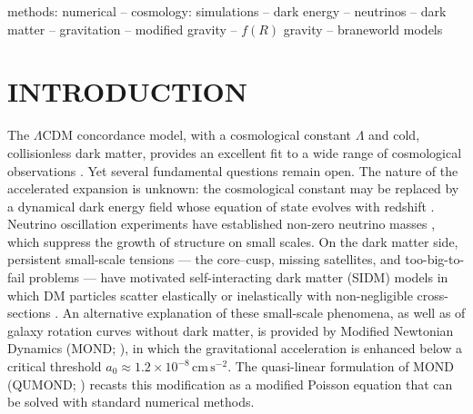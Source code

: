 \documentclass[fleqn,usenatbib]{mnras}
\newcommand{\azero}{a_0}
\begin{document}
\begin{keywords}
methods: numerical -- cosmology: simulations -- dark energy --
neutrinos -- dark matter -- gravitation -- modified gravity --
$f(R)$ gravity -- braneworld models
\end{keywords}

\section{INTRODUCTION}
\label{sec:intro}

The $\Lambda$CDM concordance model, with a cosmological constant
$\Lambda$ and cold, collisionless dark matter, provides an excellent
fit to a wide range of cosmological observations
\citep{PlanckCollaboration2020}.  Yet several fundamental questions
remain open.  The nature of the accelerated expansion is unknown: the
cosmological constant may be replaced by a dynamical dark energy field
whose equation of state evolves with redshift
\citep{Chevallier2001,Linder2003}.  Neutrino oscillation experiments
have established non-zero neutrino masses
\citep{Lesgourgues2006,Lattanzi2017}, which suppress the growth of
structure on small scales.  On the dark matter side, persistent
small-scale tensions --- the core--cusp, missing satellites, and
too-big-to-fail problems --- have motivated self-interacting dark
matter (SIDM) models in which DM particles scatter elastically or
inelastically with non-negligible cross-sections
\citep{Spergel2000,Tulin2018}.  An alternative explanation of these
small-scale phenomena, as well as of galaxy rotation curves without
dark matter, is provided by Modified Newtonian Dynamics (MOND;
\citealt{Milgrom1983}), in which the gravitational acceleration is
enhanced below a critical threshold $\azero \approx 1.2 \times
10^{-8}\,\mathrm{cm\,s^{-2}}$.  The quasi-linear formulation of MOND
(QUMOND; \citealt{Milgrom2010}) recasts this modification as a
modified Poisson equation that can be solved with standard numerical
methods.
\end{document}

